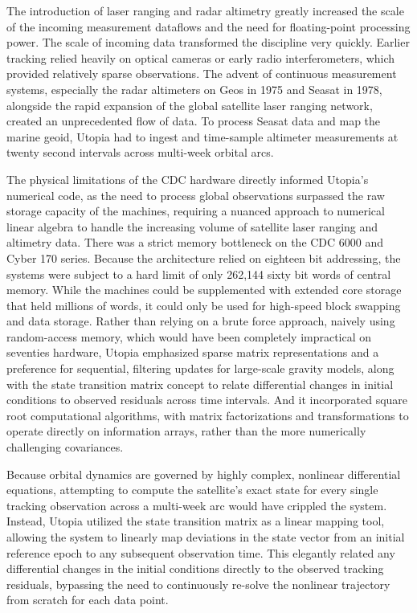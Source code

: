 The introduction of laser ranging and radar altimetry greatly increased the scale of the incoming measurement dataflows and the need for floating-point processing power. The scale of incoming data transformed the discipline very quickly. Earlier tracking relied heavily on optical cameras or early radio interferometers, which provided relatively sparse observations. The advent of continuous measurement systems, especially the radar altimeters on Geos in 1975 and Seasat in 1978, alongside the rapid expansion of the global satellite laser ranging network, created an unprecedented flow of data. To process Seasat data and map the marine geoid, Utopia had to ingest and time-sample altimeter measurements at twenty second intervals across multi-week orbital arcs.

The physical limitations of the CDC hardware directly informed Utopia’s numerical code, as the need to process global observations surpassed the raw storage capacity of the machines, requiring a nuanced approach to numerical linear algebra to handle the increasing volume of satellite laser ranging and altimetry data. There was a strict memory bottleneck on the CDC 6000 and Cyber 170 series. Because the architecture relied on eighteen bit addressing, the systems were subject to a hard limit of only 262,144 sixty bit words of central memory. While the machines could be supplemented with extended core storage that held millions of words, it could only be used for high-speed block swapping and data storage.
Rather than relying on a brute force approach, naively using random-access memory, which would have been completely impractical on seventies hardware, Utopia emphasized sparse matrix representations and a preference for sequential, filtering updates for large-scale gravity models, along with the state transition matrix concept to relate differential changes in initial conditions to observed residuals across time intervals. And it incorporated square root computational algorithms, with matrix factorizations and transformations to operate directly on information arrays, rather than the more numerically challenging covariances. 

Because orbital dynamics are governed by highly complex, nonlinear differential equations, attempting to compute the satellite's exact state for every single tracking observation across a multi-week arc would have crippled the system. Instead, Utopia utilized the state transition matrix as a linear mapping tool, allowing the system to linearly map deviations in the state vector from an initial reference epoch to any subsequent observation time. This elegantly related any differential changes in the initial conditions directly to the observed tracking residuals, bypassing the need to continuously re-solve the nonlinear trajectory from scratch for each data point.

